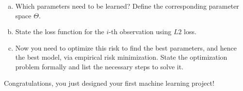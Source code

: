\documentclass[a4paper]{article}
\newcounter{aufg}
\begin{document}
{\begin{enumerate}[a)]
  State the hypothesis space for the corresponding model class.
  For this, assume the parameter vector $\thetab$ to include the intercept 
  coefficient.
  \item Which parameters need to be learned?
  Define the corresponding parameter space $\Theta$.
  \item State the loss function for the $i$-th observation using $L2$ loss. 
  \item Now you need to optimize this risk to find the best parameters, 
  and hence the best model, via empirical risk minimization. 
  State the optimization problem formally and list the necessary steps to solve 
  it. 

\end{enumerate}

Congratulations, you just designed your first machine learning project!

}

\dlz

\end{document}

